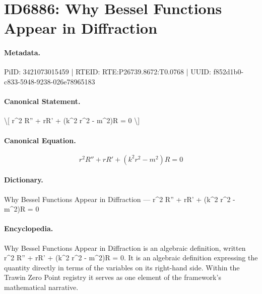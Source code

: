 \section*{ID6886: Why Bessel Functions Appear in Diffraction}
\paragraph{Metadata.}
PiID: 3421073015459 | RTEID: RTE:P26739.8672:T0.0768 | UUID: f852d1b0-c833-5948-9238-026e78965183

\paragraph{Canonical Statement.}
\textbackslash{}[ r\textasciicircum{}2 R'' + rR' + (k\textasciicircum{}2 r\textasciicircum{}2 - m\textasciicircum{}2)R = 0 \textbackslash{}]

\paragraph{Canonical Equation.}
\[
r^2 R'' + rR' + (k^2 r^2 - m^2)R = 0
\]

\paragraph{Dictionary.}
Why Bessel Functions Appear in Diffraction — r\textasciicircum{}2 R'' + rR' + (k\textasciicircum{}2 r\textasciicircum{}2 - m\textasciicircum{}2)R = 0

\paragraph{Encyclopedia.}
Why Bessel Functions Appear in Diffraction is an algebraic definition, written r\textasciicircum{}2 R'' + rR' + (k\textasciicircum{}2 r\textasciicircum{}2 - m\textasciicircum{}2)R = 0. It is an algebraic definition expressing the quantity directly in terms of the variables on its right-hand side. Within the Trawin Zero Point registry it serves as one element of the framework's mathematical narrative.
